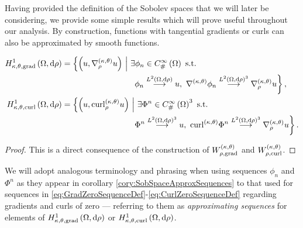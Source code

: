 Having provided the definition of the Sobolev spaces that we will later be considering, we provide some simple results which will prove useful throughout our analysis.
By construction, functions with tangential gradients or curls can also be approximated by smooth functions.
\begin{cory} \label{cory:SobSpaceApproxSequences}
	\begin{align*}
		\ktgradSob{\ddom}{\rho} &= \clbracs{ \bracs{u, \ktgrad_{\rho}u} \setVert \exists\phi_n\in\psmooth{\ddom} \text{ s.t. } \right. \\ 
		&\hspace{0.25\textwidth} \left. \phi_n\lconv{\ltwo{\ddom}{\rho}}u, \ \ktgrad\phi_n\lconv{\ltwo{\ddom}{\rho}^3}\ktgrad_{\rho}u }, \\
		\ktcurlSob{\ddom}{\rho} &= \clbracs{ \bracs{u, \ktcurl{\rho}u} \setVert \exists\Phi^n\in\psmooth{\ddom}^3 \text{ s.t. } \right. \\
		&\hspace{0.25\textwidth} \left. \Phi^n\lconv{\ltwo{\ddom}{\rho}^3}u, \ \ktcurl{}\Phi^n\lconv{\ltwo{\ddom}{\rho}^3}\ktgrad_{\rho}u }.
	\end{align*}
\end{cory}
\begin{proof}
	This is a direct consequence of the construction of $W^{\left( \kappa, \theta \right)}_{\rho,\mathrm{grad}}$ and $W^{\left( \kappa, \theta \right)}_{\rho,\mathrm{curl}}$.
\end{proof}
We will adopt analogous terminology and phrasing when using sequences $\phi_n$ and $\Phi^n$ as they appear in corollary \ref{cory:SobSpaceApproxSequences} to that used for sequences in \eqref{eq:GradZeroSequenceDef}-\eqref{eq:CurlZeroSequenceDef} regarding gradients and curls of zero --- referring to them as \emph{approximating sequences} for elements of $H^1_{\kappa,\theta,\mathrm{grad}}\left( \Omega, \mathrm{d}\rho \right)$ or $H^1_{\kappa,\theta,\mathrm{curl}}\left( \Omega, \mathrm{d}\rho \right)$.

